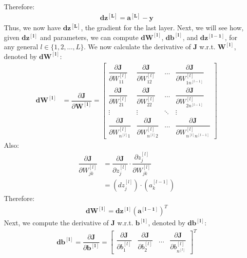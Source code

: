 \documentclass[a4paper, 12pt]{article}
\begin{document}
Therefore:
\begin{align}
\bm{dz^{\left[L\right]}} = \bm{a^{[L]}} - \bm{y}
\end{align}
Thus, we now have $\bm{dz^{\left[L\right]}}$, the gradient for the last layer. Next, we will see how, given $\bm{dz^{\left[l\right]}}$ and parameters, we can compute $\bm{dW^{\left[l\right]}}$, $\bm{db^{\left[l\right]}}$, and $\bm{dz^{\left[l-1\right]}}$, for any general $l \in \{1, 2, \dots, L\}$.
We now calculate the derivative of $\bm{J}$ w.r.t. $\bm{W^{\left[l\right]}}$, denoted by $\bm{dW^{\left[l\right]}}$:
\begin{align*}
\bm{dW^{\left[l\right]}} &= \dfrac{\partial \bm{J}}{\partial \bm{W^{\left[l\right]}}} = 
\begin{bmatrix}
\dfrac{\partial \bm{J}}{\partial W_{11}^{\left[l\right]}} &
\dfrac{\partial \bm{J}}{\partial W_{12}^{\left[l\right]}} &
\dots &
\dfrac{\partial \bm{J}}{\partial W_{1n^{[l-1]}}^{\left[l\right]}} \\
\dfrac{\partial \bm{J}}{\partial W_{21}^{\left[l\right]}} &
\dfrac{\partial \bm{J}}{\partial W_{22}^{\left[l\right]}} &
\dots &
\dfrac{\partial \bm{J}}{\partial W_{2n^{[l-1]}}^{\left[l\right]}} \\
\vdots & \vdots & \ddots & \vdots \\
\dfrac{\partial \bm{J}}{\partial W_{n^{[l]}1}^{\left[l\right]}} &
\dfrac{\partial \bm{J}}{\partial W_{n^{[l]}2}^{\left[l\right]}} &
\dots &
\dfrac{\partial \bm{J}}{\partial W_{n^{[l]}n^{[l-1]}}^{\left[l\right]}} 
\end{bmatrix}
\end{align*}
Also:
\begin{align*}
\dfrac{\partial \bm{J}}{\partial W_{jk}^{\left[l\right]}} &= \dfrac{\partial \bm{J}}{\partial z_j^{\left[l\right]}}\cdot\dfrac{\partial z_j^{\left[l\right]}}{\partial W_{jk}^{\left[l\right]}} \\
&= \left(dz_{j}^{\left[l\right]}\right)\cdot\left(a_{k}^{[l-1]}\right)
\end{align*}
Therefore:
\begin{align}
\bm{dW^{\left[l\right]}} = \bm{dz^{\left[l\right]}}(\bm{a^{[l-1]}})^T
\end{align}
Next, we compute the derivative of $\bm{J}$ w.r.t. $\bm{b^{\left[l\right]}}$, denoted by $\bm{db^{\left[l\right]}}$:
\begin{align*}
\bm{db^{\left[l\right]}} = \dfrac{\partial \bm{J}}{\partial \bm{b^{\left[l\right]}}} = 
\begin{bmatrix}
\dfrac{\partial \bm{J}}{\partial b_{1}^{\left[l\right]}} &
\dfrac{\partial \bm{J}}{\partial b_{2}^{\left[l\right]}} &
\dots &
\dfrac{\partial \bm{J}}{\partial b_{n^{[l]}}^{\left[l\right]}}
\end{bmatrix}^T
\end{align*}
\end{document}
